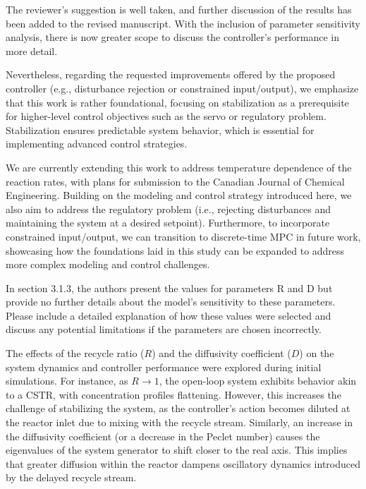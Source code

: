 \documentclass[11pt,answers]{exam}
\begin{document}
\begin{questions}
    \begin{solutionorbox} \label{comment:3_2}
        The reviewer's suggestion is well taken, and further discussion of the results has been added to the revised manuscript. With the inclusion of parameter sensitivity analysis, there is now greater scope to discuss the controller’s performance in more detail.

        Nevertheless, regarding the requested improvements offered by the proposed controller (e.g., disturbance rejection or constrained input/output), we emphasize that this work is rather foundational, focusing on stabilization as a prerequisite for higher-level control objectives such as the servo or regulatory problem. Stabilization ensures predictable system behavior, which is essential for implementing advanced control strategies.
        
        We are currently extending this work to address temperature dependence of the reaction rates, with plans for submission to the Canadian Journal of Chemical Engineering. Building on the modeling and control strategy introduced here, we also aim to address the regulatory problem (i.e., rejecting disturbances and maintaining the system at a desired setpoint). Furthermore, to incorporate constrained input/output, we can transition to discrete-time MPC in future work, showcasing how the foundations laid in this study can be expanded to address more complex modeling and control challenges.
    \end{solutionorbox}


    \question In section 3.1.3, the authors present the values for parameters R and D but provide no further details about the model's sensitivity to these parameters. Please include a detailed explanation of how these values were selected and discuss any potential limitations if the parameters are chosen incorrectly.

    \begin{solutionorbox} \label{comment:3_3}
        The effects of the recycle ratio (\(R\)) and the diffusivity coefficient (\(D\)) on the system dynamics and controller performance were explored during initial simulations. For instance, as \(R \to 1\), the open-loop system exhibits behavior akin to a CSTR, with concentration profiles flattening. However, this increases the challenge of stabilizing the system, as the controller's action becomes diluted at the reactor inlet due to mixing with the recycle stream. Similarly, an increase in the diffusivity coefficient (or a decrease in the Peclet number) causes the eigenvalues of the system generator to shift closer to the real axis. This implies that greater diffusion within the reactor dampens oscillatory dynamics introduced by the delayed recycle stream.


\end{solutionorbox}
\end{questions}
\end{document}
